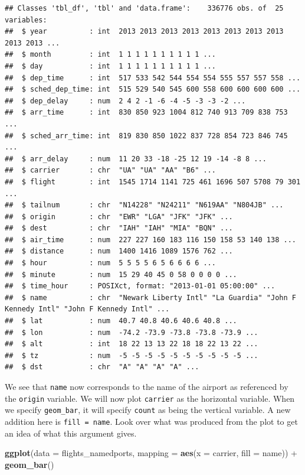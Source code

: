 \documentclass[]{tufte-book}
\newenvironment{Shaded}{\begin{snugshade}}{\end{snugshade}}
\newcommand{\KeywordTok}[1]{\textcolor[rgb]{0.13,0.29,0.53}{\textbf{{#1}}}}
\newcommand{\DataTypeTok}[1]{\textcolor[rgb]{0.13,0.29,0.53}{{#1}}}
\newcommand{\StringTok}[1]{\textcolor[rgb]{0.31,0.60,0.02}{{#1}}}
\newcommand{\NormalTok}[1]{{#1}}
\begin{document}
\begin{verbatim}
## Classes 'tbl_df', 'tbl' and 'data.frame':    336776 obs. of  25 variables:
##  $ year          : int  2013 2013 2013 2013 2013 2013 2013 2013 2013 2013 ...
##  $ month         : int  1 1 1 1 1 1 1 1 1 1 ...
##  $ day           : int  1 1 1 1 1 1 1 1 1 1 ...
##  $ dep_time      : int  517 533 542 544 554 554 555 557 557 558 ...
##  $ sched_dep_time: int  515 529 540 545 600 558 600 600 600 600 ...
##  $ dep_delay     : num  2 4 2 -1 -6 -4 -5 -3 -3 -2 ...
##  $ arr_time      : int  830 850 923 1004 812 740 913 709 838 753 ...
##  $ sched_arr_time: int  819 830 850 1022 837 728 854 723 846 745 ...
##  $ arr_delay     : num  11 20 33 -18 -25 12 19 -14 -8 8 ...
##  $ carrier       : chr  "UA" "UA" "AA" "B6" ...
##  $ flight        : int  1545 1714 1141 725 461 1696 507 5708 79 301 ...
##  $ tailnum       : chr  "N14228" "N24211" "N619AA" "N804JB" ...
##  $ origin        : chr  "EWR" "LGA" "JFK" "JFK" ...
##  $ dest          : chr  "IAH" "IAH" "MIA" "BQN" ...
##  $ air_time      : num  227 227 160 183 116 150 158 53 140 138 ...
##  $ distance      : num  1400 1416 1089 1576 762 ...
##  $ hour          : num  5 5 5 5 6 5 6 6 6 6 ...
##  $ minute        : num  15 29 40 45 0 58 0 0 0 0 ...
##  $ time_hour     : POSIXct, format: "2013-01-01 05:00:00" ...
##  $ name          : chr  "Newark Liberty Intl" "La Guardia" "John F Kennedy Intl" "John F Kennedy Intl" ...
##  $ lat           : num  40.7 40.8 40.6 40.6 40.8 ...
##  $ lon           : num  -74.2 -73.9 -73.8 -73.8 -73.9 ...
##  $ alt           : int  18 22 13 13 22 18 18 22 13 22 ...
##  $ tz            : num  -5 -5 -5 -5 -5 -5 -5 -5 -5 -5 ...
##  $ dst           : chr  "A" "A" "A" "A" ...
\end{verbatim}

We see that \texttt{name} now corresponds to the name of the airport as
referenced by the \texttt{origin} variable. We will now plot
\texttt{carrier} as the horizontal variable. When we specify
\texttt{geom\_bar}, it will specify \texttt{count} as being the vertical
variable. A new addition here is \texttt{fill\ =\ name}. Look over what
was produced from the plot to get an idea of what this argument gives.

\begin{Shaded}
\begin{Highlighting}[]
\KeywordTok{ggplot}\NormalTok{(}\DataTypeTok{data =} \NormalTok{flights_namedports, }\DataTypeTok{mapping =} \KeywordTok{aes}\NormalTok{(}\DataTypeTok{x =} \NormalTok{carrier, }\DataTypeTok{fill =} \NormalTok{name)) +}
\StringTok{  }\KeywordTok{geom_bar}\NormalTok{()}
\end{Highlighting}
\end{Shaded}
\end{document}
